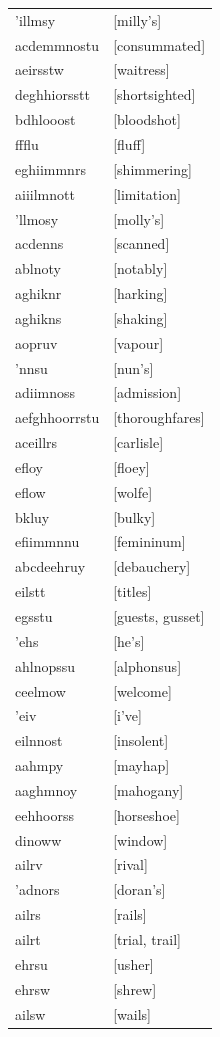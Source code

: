 \documentclass{article}
\begin{document}
\begin{tabular}{ll}
'illmsy & [milly's] \\
acdemmnostu & [consummated] \\
aeirsstw & [waitress] \\
deghhiorsstt & [shortsighted] \\
bdhlooost & [bloodshot] \\
ffflu & [fluff] \\
eghiimmnrs & [shimmering] \\
aiiilmnott & [limitation] \\
'llmosy & [molly's] \\
acdenns & [scanned] \\
ablnoty & [notably] \\
aghiknr & [harking] \\
aghikns & [shaking] \\
aopruv & [vapour] \\
'nnsu & [nun's] \\
adiimnoss & [admission] \\
aefghhoorrstu & [thoroughfares] \\
aceillrs & [carlisle] \\
efloy & [floey] \\
eflow & [wolfe] \\
bkluy & [bulky] \\
efiimmnnu & [femininum] \\
abcdeehruy & [debauchery] \\
eilstt & [titles] \\
egsstu & [guests, gusset] \\
'ehs & [he's] \\
ahlnopssu & [alphonsus] \\
ceelmow & [welcome] \\
'eiv & [i've] \\
eilnnost & [insolent] \\
aahmpy & [mayhap] \\
aaghmnoy & [mahogany] \\
eehhoorss & [horseshoe] \\
dinoww & [window] \\
ailrv & [rival] \\
'adnors & [doran's] \\
ailrs & [rails] \\
ailrt & [trial, trail] \\
ehrsu & [usher] \\
ehrsw & [shrew] \\
ailsw & [wails] \\

\end{tabular}
\end{document}
